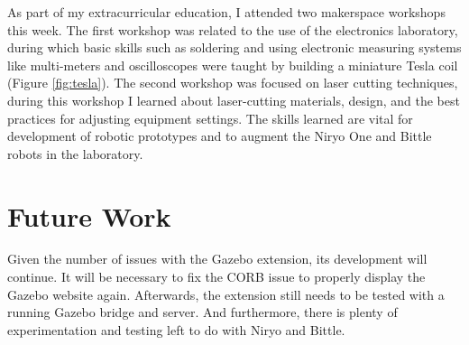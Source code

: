     As part of my extracurricular education, I attended two makerspace workshops this week. The first workshop was related to the use of the electronics laboratory, during which basic skills such as soldering and using electronic measuring systems like multi-meters and oscilloscopes were taught by building a miniature Tesla coil (Figure \ref{fig:tesla}). The second workshop was focused on laser cutting techniques, during this workshop I learned about laser-cutting materials, design, and the best practices for adjusting equipment settings. The skills learned are vital for development of robotic prototypes and to augment the Niryo One and Bittle robots in the laboratory.



\section{Future Work}

    Given the number of issues with the Gazebo extension, its development will continue. It will be necessary to fix the CORB issue to properly display the Gazebo website again. Afterwards, the extension still needs to be tested with a running Gazebo bridge and server. And furthermore, there is plenty of experimentation and testing left to do with Niryo and Bittle.